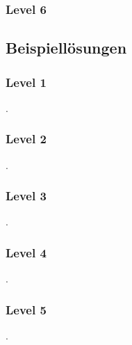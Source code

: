 \documentclass[a4paper 11pt]{article}
\begin{document}


\subsubsection{Level 6}



\subsection{Beispiellösungen}
\subsubsection{Level 1}

. 

\subsubsection{Level 2}

. 

\subsubsection{Level 3}

. 

\subsubsection{Level 4}

. 

\subsubsection{Level 5}

. 
\end{document}
